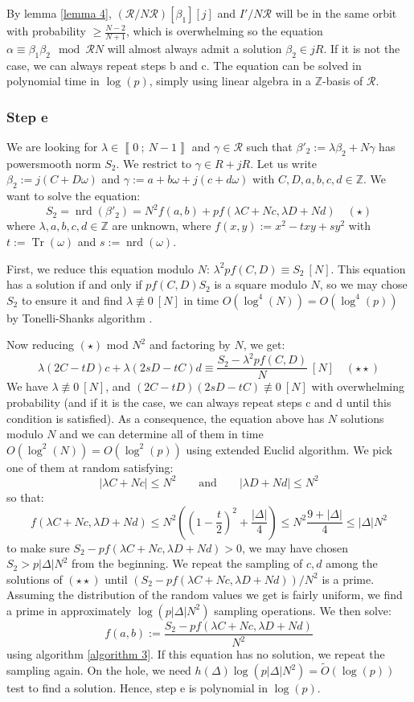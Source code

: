 \documentclass[a4paper,10pt]{report}
\theoremstyle{definition}
\theoremstyle{plain}
\theoremstyle{definition}
\newcommand{\Z}{\mathbb{Z}}
\newcommand{\m}[1]{\mathcal{#1}}
\renewcommand{\i}[2]{\left\llbracket #1~;~#2\right\rrbracket}
\renewcommand{\(}{\left(}
\renewcommand{\)}{\right)}
\DeclareMathOperator{\Tr}{Tr}
\DeclareMathOperator{\nrd}{nrd}
\begin{document}
By lemma \ref{lemma 4}, $(\m{R}/N\m{R})[\beta_1][j]$ and $I'/N\m{R}$ will be in the same orbit with probability $\geq \frac{N-2}{N+1}$, which is overwhelming so the equation $\alpha\equiv\beta_1\beta_2 \mod \m{R}N$ will almost always admit a solution $\beta_2\in jR$. If it is not the case, we can always repeat steps b and c. The equation can be solved in polynomial time in $\log(p)$, simply using linear algebra in a $\Z$-basis of $\m{R}$.

\subsubsection{Step e}

We are looking for $\lambda\in\i{0}{N-1}$ and $\gamma\in\m{R}$ such that $\beta'_2:=\lambda\beta_2+N\gamma$ has powersmooth norm $S_2$.  We restrict to $\gamma\in R+jR$. Let us write $\beta_2:=j(C+D\omega)$ and $\gamma:=a+b\omega+j(c+d\omega)$ with $C, D, a,b,c,d\in\Z$. We want to solve the equation:
\[S_2=\nrd(\beta'_2)=N^2f(a,b)+pf(\lambda C+Nc,\lambda D+Nd)\quad (\star)\]
where $\lambda,a,b,c,d\in\Z$ are unknown, where $f(x,y):=x^2-txy+sy^2$ with $t:=\Tr(\omega)$ and $s:=\nrd(\omega)$. 

First, we reduce this equation modulo $N$: $\lambda^2 p f(C,D)\equiv S_2 \ [N]$. This equation has a solution if and only if $p f(C,D) S_2$ is a square modulo $N$, so we may chose $S_2$ to ensure it and find $\lambda\not\equiv 0 \ [N]$ in time $O(\log^4(N))=O(\log^4(p))$ by Tonelli-Shanks algorithm \cite[algorithm 1.5.1]{Cohen1}.  

Now reducing $(\star)$ mod $N^2$ and factoring by $N$, we get:
\[\lambda(2C-tD)c+\lambda(2sD-tC)d\equiv \frac{S_2-\lambda^2 p f(C,D)}{N} \ [N]\quad (\star\star)\]
We have $\lambda\not\equiv 0 \ [N]$, and $(2C-tD)(2sD-tC)\not\equiv 0 \ [N]$ with overwhelming probability (and if it is the case, we can always repeat steps c and d until this condition is satisfied). As a consequence, the equation above has $N$ solutions modulo $N$ and we can determine all of them in time $O(\log^2(N))=O(\log^2(p))$ using extended Euclid algorithm.  We pick one of them at random satisfying:
\[|\lambda C+Nc|\leq N^2 \qquad \mbox{and} \qquad |\lambda D+Nd|\leq N^2\]
so that:
\[f(\lambda C+Nc,\lambda D+Nd)\leq N^2\(\(1-\frac{t}{2}\)^2+\frac{|\Delta|}{4}\)\leq N^2\frac{9+|\Delta|}{4}\leq |\Delta|N^2\]
to make sure $S_2-pf(\lambda C+Nc,\lambda D+Nd)>0$, we may have chosen $S_2>p|\Delta|N^2$ from the beginning. We repeat the sampling of $c,d$ among the solutions of $(\star\star)$ until $(S_2-pf(\lambda C+Nc,\lambda D+Nd))/N^2$ is a prime. Assuming the distribution of the random values we get is fairly uniform, we find a prime in approximately $\log(p|\Delta|N^2)$ sampling operations. We then solve:
\[f(a,b):=\frac{S_2-pf(\lambda C+Nc,\lambda D+Nd)}{N^2}\]
using algorithm \ref{algorithm 3}. If this equation has no solution, we repeat the sampling again. On the hole, we need $h(\Delta)\log(p|\Delta|N^2)=\tilde{O}(\log(p))$ test to find a solution. Hence, step e is polynomial in $\log(p)$.
\end{document}
